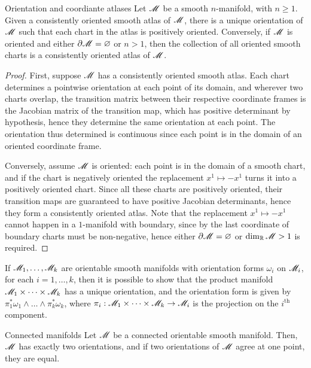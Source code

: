 \begin{proposition}{Orientation and coordiante atlases}{}
  Let $ \mathscr{M} $ be a smooth $ n $-manifold, with $ n \geq 1 $. Given a consistently oriented smooth atlas of $ \mathscr{M} $, there is a unique orientation of $ \mathscr{M} $ such that each chart in the atlas is positively oriented. Conversely, if $ \mathscr{M} $ is oriented and either $ \partial \mathscr{M} = \varnothing $ or $ n > 1 $, then the collection of all oriented smooth charts is a consistently oriented atlas of $ \mathscr{M} $.
\end{proposition}

\begin{proofbox}
  \begin{proof}
    First, suppose $ \mathscr{M} $ has a consistently oriented smooth atlas. Each chart determines a pointwise orientation at each point of its domain, and wherever two charts overlap, the transition matrix between their respective coordinate frames is the Jacobian matrix of the transition map, which has positive determinant by hypothesis, hence they determine the same orientation at each point. The orientation thus determined is continuous since each point is in the domain of an oriented coordinate frame.

    Conversely, assume $ \mathscr{M} $ is oriented: each point is in the domain of a smooth chart, and if the chart is negatively oriented the replacement $ x^1 \mapsto - x^1 $ turns it into a positively oriented chart. Since all these charts are positively oriented, their transition maps are guaranteed to have positive Jacobian determinants, hence they form a consistently oriented atlas. Note that the replacement $ x^1 \mapsto - x^1 $ cannot happen in a $ 1 $-manifold with boundary, since by  the last coordinate of boundary charts must be non-negative, hence either $ \partial \mathscr{M} = \varnothing $ or $ \dim_{\mathbb{R}} \mathscr{M} > 1 $ is required.
  \end{proof}
\end{proofbox}

If $ \mathscr{M}_1 , \dots , \mathscr{M}_k $ are orientable smooth manifolds with orientation forms $ \omega_i $ on $ \mathscr{M}_i $, for each $ i = 1,\dots,k $, then it is possible to show that the product manifold $ \mathscr{M}_1 \times \dots \times \mathscr{M}_k $ has a unique orientation, and the orientation form is given by $ \pi_1^* \omega_1 \wedge \dots \wedge \pi_k^* \omega_k $, where $ \pi_i : \mathscr{M}_1 \times \dots \times \mathscr{M}_k \rightarrow \mathscr{M}_i $ is the projection on the $ i^\text{th} $ component.

\begin{proposition}{Connected manifolds}{}
  Let $ \mathscr{M} $ be a connected orientable smooth manifold. Then, $ \mathscr{M} $ has exactly two orientations, and if two orientations of $ \mathscr{M} $ agree at one point, they are equal.
\end{proposition}


